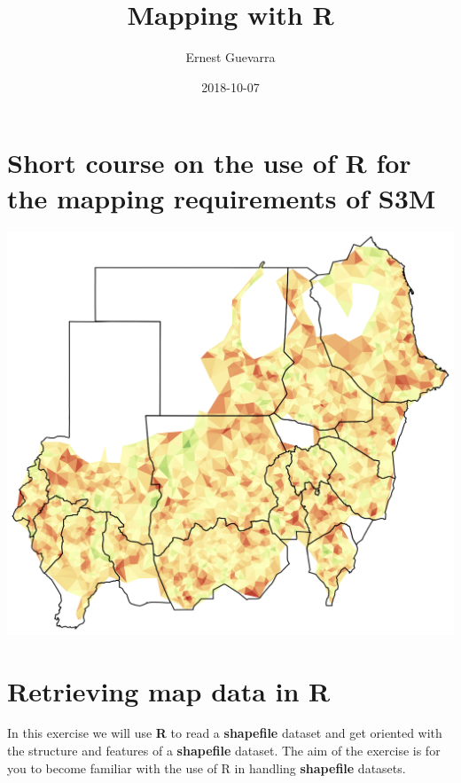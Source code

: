 \documentclass[12pt,a4paper,a4paper]{book}
\title{Mapping with R}
\author{Ernest Guevarra}
\date{2018-10-07}
\theoremstyle{definition}
\theoremstyle{definition}
\theoremstyle{definition}
\theoremstyle{remark}
\begin{document}
\maketitle

{
\hypersetup{linkcolor=black}
\setcounter{tocdepth}{1}
\tableofcontents
}
\listoftables
\listoffigures
\hypertarget{short-course-on-the-use-of-r-for-the-mapping-requirements-of-s3m}{%
\chapter*{Short course on the use of R for the mapping requirements of
S3M}\label{short-course-on-the-use-of-r-for-the-mapping-requirements-of-s3m}}

\includegraphics{figures/sudanMapTriSim.png}

\hypertarget{exercise1}{%
\chapter{Retrieving map data in R}\label{exercise1}}

In this exercise we will use \textbf{R} to read a \textbf{shapefile}
dataset and get oriented with the structure and features of a
\textbf{shapefile} dataset. The aim of the exercise is for you to become
familiar with the use of R in handling \textbf{shapefile} datasets.
\end{document}

